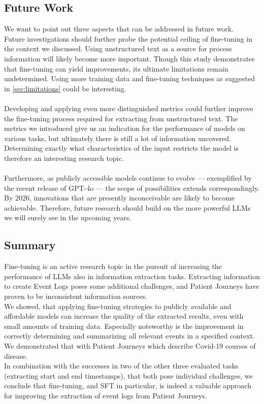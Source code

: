 \subsection{Future Work}\label{sec:future_work}
We want to point out three aspects that can be addressed in future work.\\
Future investigations should further probe the potential ceiling of fine-tuning in the context we discussed. Using unstructured text as a source for process information will likely become more important. Though this study demonstrates that fine-tuning can yield improvements, its ultimate limitations remain undetermined. 
Using more training data and fine-tuning techniques as suggested in \autoref{sec:limitations} could be interesting.\\\\
Developing and applying even more distinguished metrics could further improve the fine-tuning process required for extracting from unstructured text. The metrics we introduced give us an indication for the performance of models on various tasks, but ultimately there is still a lot of information uncovered. Determining exactly what characteristics of the input restricts the model is therefore an interesting research topic.\\\\
Furthermore, as publicly accessible models continue to evolve — exemplified by the recent release of GPT-4o — the scope of possibilities extends correspondingly. By 2026, innovations that are presently inconceivable are likely to become achievable. Therefore, future research should build on the more powerful LLMs we will surely see in the upcoming years.

\subsection{Summary}\label{sec:summary}
Fine-tuning is an active research topic in the pursuit of increasing the performance of LLMs also in information extraction tasks. Extracting information to create Event Logs poses some additional challenges, and Patient Journeys have proven to be inconsistent information sources.\\
We showed, that applying fine-tuning strategies to publicly available and affordable models can increase the quality of the extracted results, even with small amounts of training data. Especially noteworthy is the improvement in correctly determining and summarizing all relevant events in a specified context. We demonstrated that with Patient Journeys which describe Covid-19 courses of disease.\\
In combination with the successes in two of the other three evaluated tasks (extracting start and end timestamps), that both pose individual challenges, we conclude that fine-tuning, and SFT in particular, is indeed a valuable approach for improving the extraction of event logs from Patient Journeys.